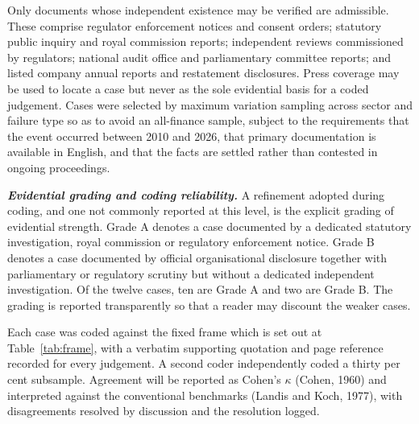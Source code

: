 \documentclass[12pt,a4paper]{article}
\begin{document}
Only documents whose independent existence may be verified are admissible. These comprise
regulator enforcement notices and consent orders; statutory public inquiry and royal commission
reports; independent reviews commissioned by regulators; national audit office and parliamentary
committee reports; and listed company annual reports and restatement disclosures. Press coverage
may be used to locate a case but never as the sole evidential basis for a coded judgement. Cases
were selected by maximum variation sampling across sector and failure type so as to avoid an
all-finance sample, subject to the requirements that the event occurred between 2010 and 2026,
that primary documentation is available in English, and that the facts are settled rather than
contested in ongoing proceedings.

\textbf{\emph{Evidential grading and coding reliability.}} A refinement adopted during coding, and
one not commonly reported at this level, is the explicit grading of evidential strength. Grade A
denotes a case documented by a dedicated statutory investigation, royal commission or regulatory
enforcement notice. Grade B denotes a case documented by official organisational disclosure
together with parliamentary or regulatory scrutiny but without a dedicated independent
investigation. Of the twelve cases, ten are Grade A and two are Grade B. The grading is reported
transparently so that a reader may discount the weaker cases.

Each case was coded against the fixed frame which is set out at Table~\ref{tab:frame}, with a verbatim
supporting quotation and page reference recorded for every judgement. A second coder independently coded a
thirty per cent subsample. Agreement will be reported as Cohen's $\kappa$ (Cohen, 1960) and interpreted
against the conventional benchmarks (Landis and Koch, 1977), with disagreements resolved by discussion and
the resolution logged.
\end{document}

